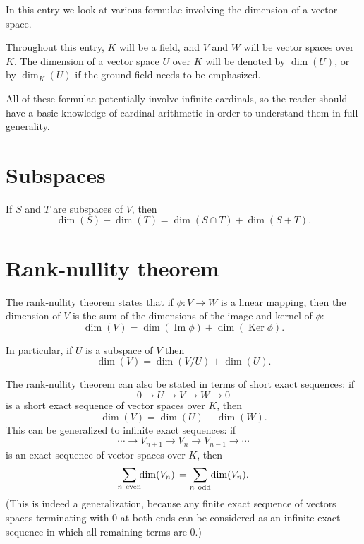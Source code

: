 \documentclass[12pt]{article}
\def\Im{\operatorname{Im}}
\def\Ker{\operatorname{Ker}}
\begin{document}

In this entry we look at various formulae 
involving the dimension of a vector space.

Throughout this entry, $K$ will be a field,
and $V$ and $W$ will be vector spaces over $K$.
The dimension of a vector space $U$ over $K$
will be denoted by $\dim(U)$, 
or by $\dim_K(U)$ if the ground field needs to be emphasized.

All of these formulae potentially involve infinite cardinals,
so the reader should have a basic knowledge of cardinal arithmetic
in order to understand them in full generality.

\section*{Subspaces}

If $S$ and $T$ are subspaces of $V$, then
\[
  \dim(S)+\dim(T)=\dim(S\cap T)+\dim(S+T).
\]

\section*{Rank-nullity theorem}

The rank-nullity theorem states that if $\phi\colon V\to W$ is a linear mapping,
then the dimension of $V$ 
is the sum of the dimensions of the image and kernel of $\phi$:
\[
  \dim(V)=\dim(\Im\phi)+\dim(\Ker\phi).
\]

In particular, if $U$ is a subspace of $V$ then
\[
  \dim(V)=\dim(V/U)+\dim(U).
\]

The rank-nullity theorem can also be stated in terms of short exact sequences:
if
\[
  0\longrightarrow U\longrightarrow V\longrightarrow
  W\longrightarrow 0
\]
is a short exact sequence of vector spaces over $K$,
then
\[
  \dim(V) = \dim(U) + \dim(W).
\]
This can be generalized to infinite exact sequences:
if
\[
  \cdots\longrightarrow V_{n+1}\longrightarrow V_n\longrightarrow 
  V_{n-1}\longrightarrow \cdots
\]
is an exact sequence of vector spaces over $K$,
then
\[
  \sum_{n\rm{~even}}\!\!\dim(V_n)\,=\sum_{n\rm{~odd}}\!\dim(V_n).
\]
(This is indeed a generalization, 
because any finite exact sequence of vectors spaces
terminating with $0$ at both ends
can be considered as an infinite exact sequence
in which all remaining terms are $0$.)
\end{document}
